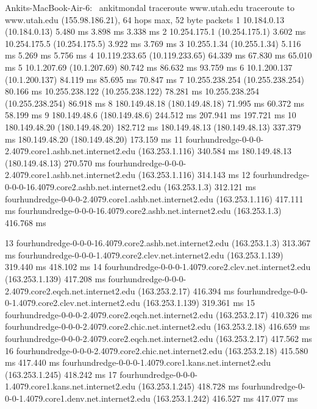 \begin{enumerate}[a.]
\begin{code}
Ankits-MacBook-Air-6:~ ankitmondal traceroute www.utah.edu
traceroute to www.utah.edu (155.98.186.21), 64 hops max, 52 byte packets
 1  10.184.0.13 (10.184.0.13)  5.480 ms  3.898 ms  3.338 ms
 2  10.254.175.1 (10.254.175.1)  3.602 ms
    10.254.175.5 (10.254.175.5)  3.922 ms  3.769 ms
 3  10.255.1.34 (10.255.1.34)  5.116 ms  5.269 ms  5.756 ms
 4  10.119.233.65 (10.119.233.65)  64.339 ms  67.830 ms  65.010 ms
 5  10.1.207.69 (10.1.207.69)  80.742 ms  86.632 ms  93.759 ms
 6  10.1.200.137 (10.1.200.137)  84.119 ms  85.695 ms  70.847 ms
 7  10.255.238.254 (10.255.238.254)  80.166 ms
    10.255.238.122 (10.255.238.122)  78.281 ms
    10.255.238.254 (10.255.238.254)  86.918 ms
 8  180.149.48.18 (180.149.48.18)  71.995 ms  60.372 ms  58.199 ms
 9  180.149.48.6 (180.149.48.6)  244.512 ms  207.941 ms  197.721 ms
10  180.149.48.20 (180.149.48.20)  182.712 ms
    180.149.48.13 (180.149.48.13)  337.379 ms
    180.149.48.20 (180.149.48.20)  173.159 ms
11  fourhundredge-0-0-0-2.4079.core1.ashb.net.internet2.edu (163.253.1.116)  340.584 ms
    180.149.48.13 (180.149.48.13)  270.570 ms
    fourhundredge-0-0-0-2.4079.core1.ashb.net.internet2.edu (163.253.1.116)  314.143 ms
12  fourhundredge-0-0-0-16.4079.core2.ashb.net.internet2.edu (163.253.1.3)  312.121 ms
    fourhundredge-0-0-0-2.4079.core1.ashb.net.internet2.edu (163.253.1.116)  417.111 ms
    fourhundredge-0-0-0-16.4079.core2.ashb.net.internet2.edu (163.253.1.3)  416.768 ms
\end{code}
\begin{code}
13  fourhundredge-0-0-0-16.4079.core2.ashb.net.internet2.edu (163.253.1.3)  313.367 ms
    fourhundredge-0-0-0-1.4079.core2.clev.net.internet2.edu (163.253.1.139)  319.440 ms  418.102 ms
14  fourhundredge-0-0-0-1.4079.core2.clev.net.internet2.edu (163.253.1.139)  417.208 ms
    fourhundredge-0-0-0-2.4079.core2.eqch.net.internet2.edu (163.253.2.17)  416.394 ms
    fourhundredge-0-0-0-1.4079.core2.clev.net.internet2.edu (163.253.1.139)  319.361 ms
15  fourhundredge-0-0-0-2.4079.core2.eqch.net.internet2.edu (163.253.2.17)  410.326 ms
    fourhundredge-0-0-0-2.4079.core2.chic.net.internet2.edu (163.253.2.18)  416.659 ms
    fourhundredge-0-0-0-2.4079.core2.eqch.net.internet2.edu (163.253.2.17)  417.562 ms
16  fourhundredge-0-0-0-2.4079.core2.chic.net.internet2.edu (163.253.2.18)  415.580 ms  417.440 ms
    fourhundredge-0-0-0-1.4079.core1.kans.net.internet2.edu (163.253.1.245)  418.242 ms
17  fourhundredge-0-0-0-1.4079.core1.kans.net.internet2.edu (163.253.1.245)  418.728 ms
    fourhundredge-0-0-0-1.4079.core1.denv.net.internet2.edu (163.253.1.242)  416.527 ms  417.077 ms

\end{code}
\end{enumerate}
